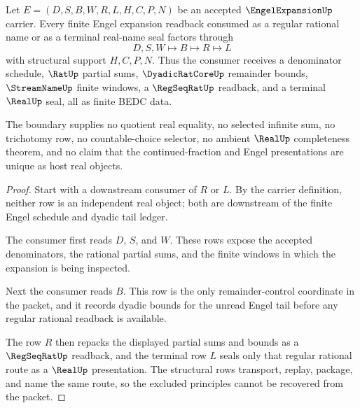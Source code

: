 \begin{theorem}
\label{thm:engel-expansion-real-readback-boundary}
Let $E=(D,S,B,W,R,L,H,C,P,N)$ be an accepted $\EngelExpansionUp$ carrier. Every finite Engel expansion readback consumed as a regular rational name or as a terminal real-name seal factors through
$$
D,S,W \longmapsto B \longmapsto R \longmapsto L
$$
with structural support $H,C,P,N$. Thus the consumer receives a denominator schedule, $\RatUp$ partial sums, $\DyadicRatCoreUp$ remainder bounds, $\StreamNameUp$ finite windows, a $\RegSeqRatUp$ readback, and a terminal $\RealUp$ seal, all as finite BEDC data.

The boundary supplies no quotient real equality, no selected infinite sum, no trichotomy row, no countable-choice selector, no ambient $\RealUp$ completeness theorem, and no claim that the continued-fraction and Engel presentations are unique as host real objects.
\end{theorem}
\begin{proof}
Start with a downstream consumer of $R$ or $L$. By the carrier definition, neither row is an independent real object; both are downstream of the finite Engel schedule and dyadic tail ledger.

The consumer first reads $D$, $S$, and $W$. These rows expose the accepted denominators, the rational partial sums, and the finite windows in which the expansion is being inspected.

Next the consumer reads $B$. This row is the only remainder-control coordinate in the packet, and it records dyadic bounds for the unread Engel tail before any regular rational readback is available.

The row $R$ then repacks the displayed partial sums and bounds as a $\RegSeqRatUp$ readback, and the terminal row $L$ seals only that regular rational route as a $\RealUp$ presentation. The structural rows transport, replay, package, and name the same route, so the excluded principles cannot be recovered from the packet.
\end{proof}



